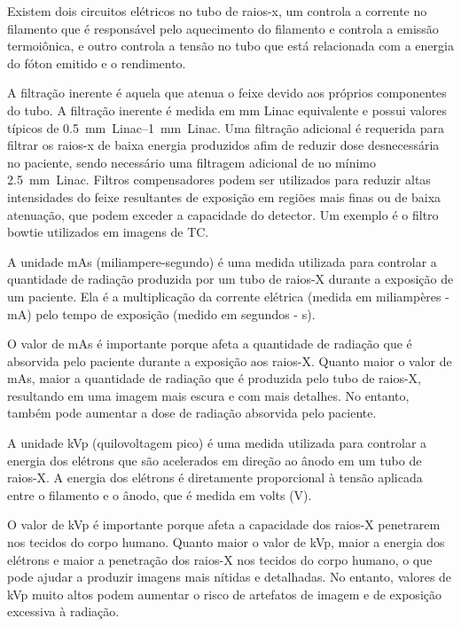 \documentclass[11pt,a4paper]{article}
\newcounter{exemplo}
\begin{document}
                Existem dois circuitos elétricos no tubo de raios-x, um controla a corrente no filamento que é responsável pelo aquecimento do filamento e controla a emissão termoiônica, e outro controla a tensão no tubo que está relacionada com a energia do fóton emitido e o rendimento.

                A filtração inerente é aquela que atenua o feixe devido aos próprios componentes do tubo. A filtração inerente é medida em mm Linac equivalente e possui valores típicos de \qtyrange{0.5}{1}{mm Linac}. Uma filtração adicional é requerida para filtrar os raios-x de baixa energia produzidos afim de reduzir dose desnecessária no paciente, sendo necessário uma filtragem adicional de no mínimo \qty{2.5}{mm Linac}. Filtros compensadores podem ser utilizados para reduzir altas intensidades do feixe resultantes de exposição em regiões mais finas ou de baixa atenuação, que podem exceder a capacidade do detector. Um exemplo é o filtro bowtie utilizados em imagens de TC.

                A unidade mAs (miliampere-segundo) é uma medida utilizada para controlar a quantidade de radiação produzida por um tubo de raios-X durante a exposição de um paciente. Ela é a multiplicação da corrente elétrica (medida em miliampères - mA) pelo tempo de exposição (medido em segundos - s).

                O valor de mAs é importante porque afeta a quantidade de radiação que é absorvida pelo paciente durante a exposição aos raios-X. Quanto maior o valor de mAs, maior a quantidade de radiação que é produzida pelo tubo de raios-X, resultando em uma imagem mais escura e com mais detalhes. No entanto, também pode aumentar a dose de radiação absorvida pelo paciente.

                A unidade kVp (quilovoltagem pico) é uma medida utilizada para controlar a energia dos elétrons que são acelerados em direção ao ânodo em um tubo de raios-X. A energia dos elétrons é diretamente proporcional à tensão aplicada entre o filamento e o ânodo, que é medida em volts (V).

                O valor de kVp é importante porque afeta a capacidade dos raios-X penetrarem nos tecidos do corpo humano. Quanto maior o valor de kVp, maior a energia dos elétrons e maior a penetração dos raios-X nos tecidos do corpo humano, o que pode ajudar a produzir imagens mais nítidas e detalhadas. No entanto, valores de kVp muito altos podem aumentar o risco de artefatos de imagem e de exposição excessiva à radiação.
\end{document}
